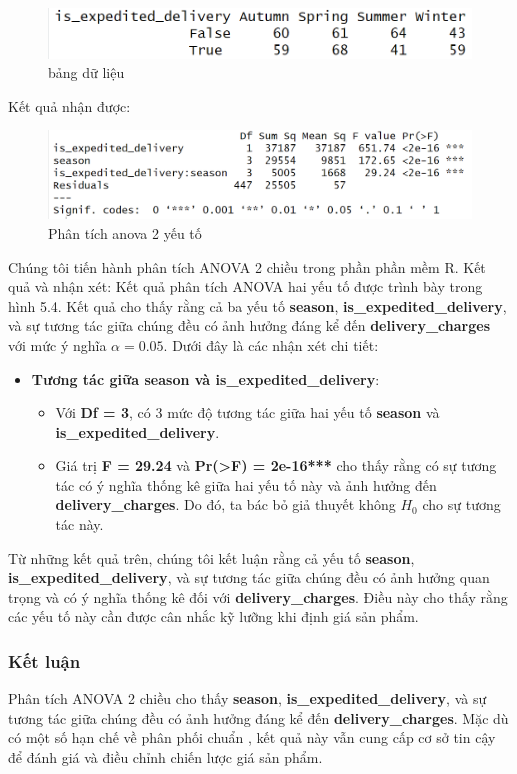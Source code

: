         \begin{figure}[!htbp]
            \centering
            \includegraphics[width=1\linewidth]{graphics/5.4.3.png}
            \caption{bảng dữ liệu}
        \end{figure}
        Kết quả nhận được: 

        \begin{figure}[!htbp]
            \centering
            \includegraphics[width=1\linewidth]{graphics/5.4.4.png}
            \caption{Phân tích anova 2 yếu tố}
        \end{figure}

        Chúng tôi tiến hành phân tích ANOVA 2 chiều trong phần phần mềm R. 
        Kết quả và nhận xét: 
        Kết quả phân tích ANOVA hai yếu tố được trình bày trong hình 5.4. Kết quả cho thấy rằng cả ba yếu tố \textbf{season}, \textbf{is\_expedited\_delivery}, và sự tương tác giữa chúng đều có ảnh hưởng đáng kể đến \textbf{delivery\_charges} với mức ý nghĩa $\alpha = 0.05$. Dưới đây là các nhận xét chi tiết:

        \begin{itemize}
    \item \textbf{Tương tác giữa season và is\_expedited\_delivery}:
    \begin{itemize}
        \item Với \textbf{Df = 3}, có 3 mức độ tương tác giữa hai yếu tố \textbf{season} và \textbf{is\_expedited\_delivery}.
        \item Giá trị \textbf{F = 29.24} và \textbf{Pr(>F) = 2e-16***} cho thấy rằng có sự tương tác có ý nghĩa thống kê giữa hai yếu tố này và ảnh hưởng đến \textbf{delivery\_charges}. Do đó, ta bác bỏ giả thuyết không \(H_0\) cho sự tương tác này.
    \end{itemize}

    \end{itemize}

 Từ những kết quả trên, chúng tôi kết luận rằng cả yếu tố \textbf{season}, \textbf{is\_expedited\_delivery}, và sự tương tác giữa chúng đều có ảnh hưởng quan trọng và có ý nghĩa thống kê đối với \textbf{delivery\_charges}. Điều này cho thấy rằng các yếu tố này cần được cân nhắc kỹ lưỡng khi định giá sản phẩm.
               
        
\subsubsection{Kết luận}
Phân tích ANOVA 2 chiều cho thấy \textbf{season}, \textbf{is\_expedited\_delivery}, và sự tương tác giữa chúng đều có ảnh hưởng đáng kể đến \textbf{delivery\_charges}. Mặc dù có một số hạn chế về phân phối chuẩn , kết quả này vẫn cung cấp cơ sở tin cậy để đánh giá và điều chỉnh chiến lược giá sản phẩm.
